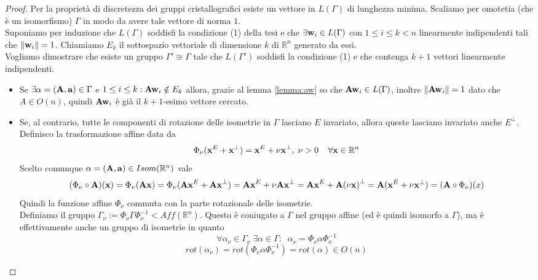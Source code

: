 \documentclass[a4paper,11pt,openright,twoside	]{book}
\begin{document}
\begin{proof}
Per la proprietà di discretezza dei gruppi cristallografici esiste un vettore in $L(\Gamma)$ di lunghezza minima. Scaliamo per omotetia (che è un isomorfismo) $\Gamma$ in modo da avere tale vettore di norma $1$. \\ 

Suponiamo per induzione che $L(\Gamma)$ soddisfi la condizione (1) della tesi e che $\exists \vb{w}_i \in L(\Gamma)$ con $1 \leq i \leq k < n $ linearmente indipendenti tali che $\norm{\vb{w}_i} = 1 $.  
Chiamiamo $E_k$ il sottospazio vettoriale di dimensione $k$ di $\mathbb{R}^n$ generato da essi.\\
Vogliamo dimostrare che esiste un gruppo $\Gamma ' \cong \Gamma$ tale che $L(\Gamma')$ soddisfi la condizione (1) e che contenga $k+1$ vettori linearmente indipendenti. 
\begin{itemize}
\item Se $\exists \alpha = (\vb{A, a}) \in \Gamma $ e $1 \leq i \leq k: \vb{Aw}_i \notin E_k$ allora, grazie al lemma \ref{lemma:aw} so che $\vb{Aw}_i \in L(\Gamma)$, inoltre $\norm{\vb{Aw}_i} = 1$ dato che $A \in O(n)$, quindi $\vb{Aw}_i$ è già il $k+1$-esimo vettore cercato.
\item Se, al contrario, tutte le componenti di rotazione delle isometrie in $\Gamma$ lasciano $E$ invariato, allora queste lasciano invariato anche $E^{\perp}$. \\
Definisco la trasformazione affine data da
\[ \Phi_{\nu} (\vb{x}^E + \vb{x}^{\perp} )=  \vb{x}^E + \nu \vb{x}^{\perp} , \; \nu > 0  \; \; \; \; \forall \vb{x} \in \mathbb{R}^n\]
Scelto comunque $\alpha = (\vb{A,a}) \in Isom(\mathbb{R}^n)$ vale
\[ ( \Phi_{\nu}  \circ \vb{A})(\vb{x}) = \Phi_{\nu} (\vb{Ax})  = \Phi_{\nu} (\vb{Ax}^E +\vb{Ax }^{\perp})  = \vb{Ax}^E +\nu \vb{Ax }^{\perp} = \vb{Ax}^E +\vb{A(\nu x) }^{\perp} = \vb{A} ( \vb{x}^E +\nu \vb{x }^{\perp})  = ( \vb{A} \circ \Phi_{\nu} ) (x)\]
Quindi la funzione affine $\Phi_{\nu}$ commuta con la parte rotazionale delle isometrie. \\
Definiamo il gruppo $\Gamma_{\nu} := \Phi_{\nu} \Gamma \Phi_{\nu}^{-1} < Aff(\mathbb{R}^n)$. Questo è coniugato a $\Gamma$ nel gruppo affine (ed è quindi isomorfo a $\Gamma$), ma è effettivamente anche un gruppo di isometrie in quanto 
\[ \forall \alpha_{\nu} \in \Gamma_{\nu} \; \exists \alpha \in \Gamma : \; \; \alpha_{\nu} =  \Phi_{\nu} \alpha \Phi_{\nu}^{-1}  \]
\[ rot( \alpha_{\nu}) = rot(\Phi_{\nu} \alpha \Phi_{\nu}^{-1}) = rot(\alpha) \in O(n)\]


\end{itemize}
\end{proof}
\end{document}
